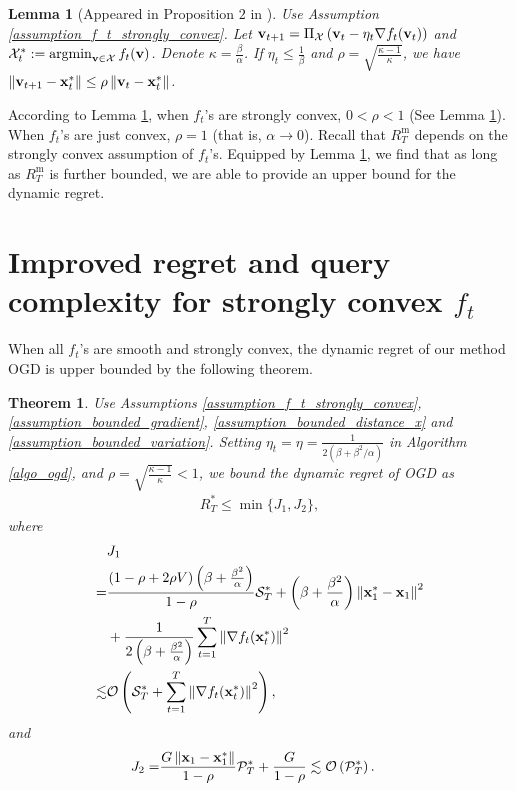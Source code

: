 \documentclass[journal]{IEEEtran}
\newtheorem{Theorem}{\bf{Theorem}}
\newtheorem{Lemma}{\bf{Lemma}}
\begin{document}
\begin{Lemma}[Appeared in Proposition $2$ in \cite{Mokhtari:2016jz}]
\label{lemma_linear_x}
Use Assumption \ref{assumption_f_t_strongly_convex}. Let ${\bf v}_{t+1} = \Pi_{{\mathcal{X}}} \left( {\bf v}_t - \eta_t \nabla f_t({\bf v}_t) \right)$ and $\Xcal_t^{\ast} := \argmin_{\v\in\Xcal} f_t(\v)$. Denote $\kappa = \frac{\beta}{\alpha}$. If $\eta_t \le \frac{1}{\beta}$ and $\rho = \sqrt{\frac{\kappa - 1}{\kappa}}$, we have $\left\lVert{\bf v}_{t+1} - {\bf x}_t^{\ast} \right\rVert    \le  \rho    \left\lVert{\bf v}_t - {\bf x}_t^{\ast} \right\rVert$.
\end{Lemma} According to Lemma \ref{lemma_linear_x}, when $f_t$'s are strongly convex, $0< \rho< 1 $ (See  Lemma \ref{lemma_linear_x}). When $f_t$'s are just convex, $\rho = 1$ (that is, $\alpha \rightarrow 0$). Recall that $R^{\mathrm{m}}_T$ depends on the strongly convex assumption of $f_t$'s. Equipped by Lemma \ref{lemma_linear_x},  we find that as long as $R^{\mathrm{m}}_T$ is further bounded, we are able to provide an upper bound for the dynamic regret.


\section{Improved regret and query complexity for strongly convex $f_t$} 
\label{sect_dynamic_regret_strongly_convex}


When all $f_t$'s are smooth and strongly convex, the dynamic regret of our method OGD is upper bounded by the following theorem.
\begin{Theorem}
\label{theorem_s_sc_regret}
Use Assumptions \ref{assumption_f_t_strongly_convex}, \ref{assumption_bounded_gradient}, \ref{assumption_bounded_distance_x} and \ref{assumption_bounded_variation}. Setting  $\eta_t = \eta = \frac{1}{2(\beta+\beta^2/\alpha)}$ in Algorithm \ref{algo_ogd}, and $\rho = \sqrt{\frac{\kappa - 1}{\kappa}} < 1$, we bound the dynamic regret of OGD as
\begin{align}
\nonumber     
R_T^{\ast} \le \min \{J_1, J_2\}, 
\end{align} where 
\begin{align}
\nonumber
& J_1 \\ \nonumber 
= & \frac{(1-\rho + 2\rho V)\left(  \beta + \frac{\beta^2}{\alpha}  \right)}{1-\rho} {\mathcal{S}}_T^{\ast}   + \left(  \beta + \frac{\beta^2}{\alpha}  \right)\left\lVert{\bf x}_1^{\ast} - {\bf x}_1\right\rVert^2   \\ \nonumber 
& + \frac{1}{ 2\left(  \beta + \frac{\beta^2}{\alpha}  \right) }\sum\limits_{t=1}^{T} \left\lVert\nabla f_t({\bf x}_t^{\ast})\right\rVert^2 \\ \nonumber
\lesssim & {\mathcal{O}}\left(  {\mathcal{S}}_T^{\ast} + \sum\limits_{t=1}^{T} \left\lVert\nabla f_t({\bf x}_t^{\ast})\right\rVert^2  \right),
\end{align} and 
\begin{align}
\nonumber
J_2 = & \frac{G\left\lVert{\bf x}_1-{\bf x}_1^{\ast}\right\rVert}{1-\rho} {\mathcal{P}}_T^{\ast} + \frac{G}{1-\rho} \lesssim  {\mathcal{O}}\left(  {\mathcal{P}}_T^{\ast}  \right).
\end{align}

\end{Theorem} 
\end{document}
